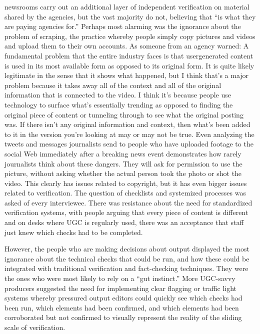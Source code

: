 \documentclass[symmetric, notoc, nobib]{towcenter-book}
\begin{document}
newsrooms carry out an additional layer of independent verification on
material shared by the agencies, but the vast majority do not, believing that
``is what they are paying agencies for.''
Perhaps most alarming was the ignorance about the problem of scraping,
the practice whereby people simply copy pictures and videos and upload
them to their own accounts. As someone from an agency warned:
A fundamental problem that the entire industry faces is that usergenerated
content is used in its most available form as opposed to
its original form. It is quite likely legitimate in the sense that it shows
what happened, but I think that's a major problem because it takes
away all of the context and all of the original information that is connected
to the video. I think it's because people use technology to
surface what's essentially trending as opposed to finding the original
piece of content or tunneling through to see what the original
posting was. If there isn't any original information and context, then
what's been added to it in the version you're looking at may or may
not be true.
Even analyzing the tweets and messages journalists send to people who
have uploaded footage to the social Web immediately after a breaking news
event demonstrates how rarely journalists think about these dangers. They
will ask for permission to use the picture, without asking whether the actual
person took the photo or shot the video. This clearly has issues related to
copyright, but it has even bigger issues related to verification.
The question of checklists and systemized processes was asked of every
interviewee. There was resistance about the need for standardized verification
systems, with people arguing that every piece of content is different
and on desks where UGC is regularly used, there was an acceptance that
staff just knew which checks had to be completed.

However, the people who are making decisions about output displayed
the most ignorance about the technical checks that could be run, and how
these could be integrated with traditional verification and fact-checking
techniques. They were the ones who were most likely to rely on a ``gut
instinct.'' More UGC-savvy producers suggested the need for implementing
clear flagging or traffic light systems whereby pressured output editors
could quickly see which checks had been run, which elements had been
confirmed, and which elements had been corroborated but not confirmed
to visually represent the reality of the sliding scale of verification.
\end{document}
